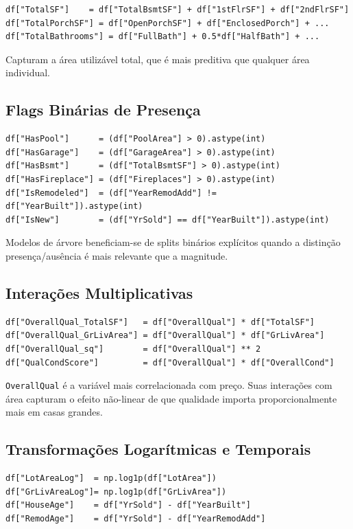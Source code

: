 \documentclass[11pt]{article}
\begin{document}
\begin{verbatim}
df["TotalSF"]    = df["TotalBsmtSF"] + df["1stFlrSF"] + df["2ndFlrSF"]
df["TotalPorchSF"] = df["OpenPorchSF"] + df["EnclosedPorch"] + ...
df["TotalBathrooms"] = df["FullBath"] + 0.5*df["HalfBath"] + ...
\end{verbatim}

Capturam a área utilizável total, que é mais preditiva que qualquer
área individual.
\subsection{Flags Binárias de Presença}
\label{sec:org85b3ca8}

\begin{verbatim}
df["HasPool"]      = (df["PoolArea"] > 0).astype(int)
df["HasGarage"]    = (df["GarageArea"] > 0).astype(int)
df["HasBsmt"]      = (df["TotalBsmtSF"] > 0).astype(int)
df["HasFireplace"] = (df["Fireplaces"] > 0).astype(int)
df["IsRemodeled"]  = (df["YearRemodAdd"] != df["YearBuilt"]).astype(int)
df["IsNew"]        = (df["YrSold"] == df["YearBuilt"]).astype(int)
\end{verbatim}

Modelos de árvore beneficiam-se de splits binários explícitos quando a
distinção presença/ausência é mais relevante que a magnitude.
\subsection{Interações Multiplicativas}
\label{sec:orgb17fea7}

\begin{verbatim}
df["OverallQual_TotalSF"]   = df["OverallQual"] * df["TotalSF"]
df["OverallQual_GrLivArea"] = df["OverallQual"] * df["GrLivArea"]
df["OverallQual_sq"]        = df["OverallQual"] ** 2
df["QualCondScore"]         = df["OverallQual"] * df["OverallCond"]
\end{verbatim}

\texttt{OverallQual} é a variável mais correlacionada com preço. Suas
interações com área capturam o efeito não-linear de que qualidade
importa proporcionalmente mais em casas grandes.
\subsection{Transformações Logarítmicas e Temporais}
\label{sec:orgc834dca}

\begin{verbatim}
df["LotAreaLog"]  = np.log1p(df["LotArea"])
df["GrLivAreaLog"]= np.log1p(df["GrLivArea"])
df["HouseAge"]    = df["YrSold"] - df["YearBuilt"]
df["RemodAge"]    = df["YrSold"] - df["YearRemodAdd"]
\end{verbatim}
\end{document}
